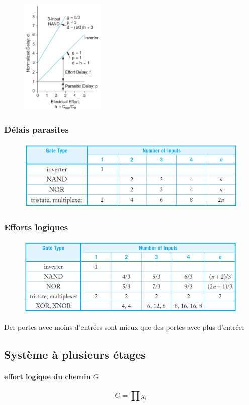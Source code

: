 \documentclass[resume]{subfiles}
\begin{document}
\begin{multicols}{3}
\begin{figure}[H]
\centering
\includegraphics[width=4.00cm]{img_44.png}
\end{figure}
\subsubsection{Délais parasites}
\begin{figure}[H]
\centering
\includegraphics[width=0.9\columnwidth]{img_46.png}
\end{figure}
\subsubsection{Efforts logiques}
\begin{figure}[H]
\centering
\includegraphics[width=0.9\columnwidth]{img_47.png}
\end{figure}
Des portes avec moins d'entrées sont mieux que des portes avec plus d'entrées
\subsection{Système à plusieurs étages}
\paragraph{effort logique du chemin $G$}
$$G=\prod g_i$$

\end{multicols}
\end{document}
